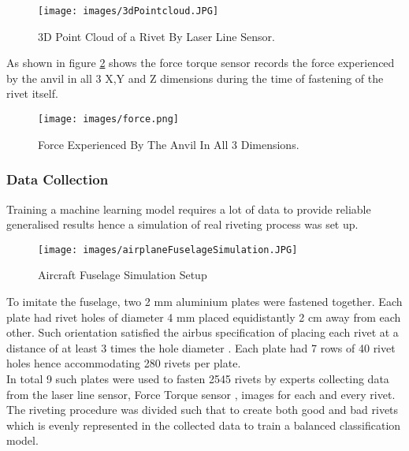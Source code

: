 \documentclass{article}
\begin{document}
\begin{figure}[H]
        \centering
        \texttt{[image: images/3dPointcloud.JPG]}
        \caption{3D Point Cloud of a Rivet By Laser Line Sensor. }
         \label{fig:}
        \end{figure}


As shown in figure \ref{fig:forceExperienced} shows the force torque sensor records the force experienced by the anvil in all 3 X,Y and Z dimensions during the time of fastening of the rivet itself.

\begin{figure}[H]
        \centering
        \texttt{[image: images/force.png]}
        \caption{Force Experienced By The Anvil In All 3 Dimensions.}
         \label{fig:forceExperienced}
        \end{figure}

\subsubsection{Data Collection}

Training a machine learning model requires a lot of data to provide reliable generalised results hence a simulation of real riveting process was set up.\\

\begin{figure}[H]
        \centering
        \texttt{[image: images/airplaneFuselageSimulation.JPG]}
        \caption{Aircraft Fuselage Simulation Setup}
         \label{fig:Aircraftfuselagesimulationsetup}
        \end{figure}

To imitate the fuselage, two 2 mm aluminium plates were fastened together. Each plate had rivet holes of diameter 4 mm placed equidistantly 2 cm away from each other. Such orientation satisfied the airbus specification of placing each rivet at a distance of at least 3 times the hole diameter \cite{airbusRivetSpecification}. Each plate had 7 rows of 40 rivet holes hence accommodating 280 rivets per plate.\\

In total 9 such plates were used to fasten 2545 rivets by experts collecting data from the laser line sensor, Force Torque sensor , images for each and every rivet. The riveting procedure was divided such that to create both good and bad rivets which is evenly represented in the collected data to train a balanced classification model.\\
\end{document}

